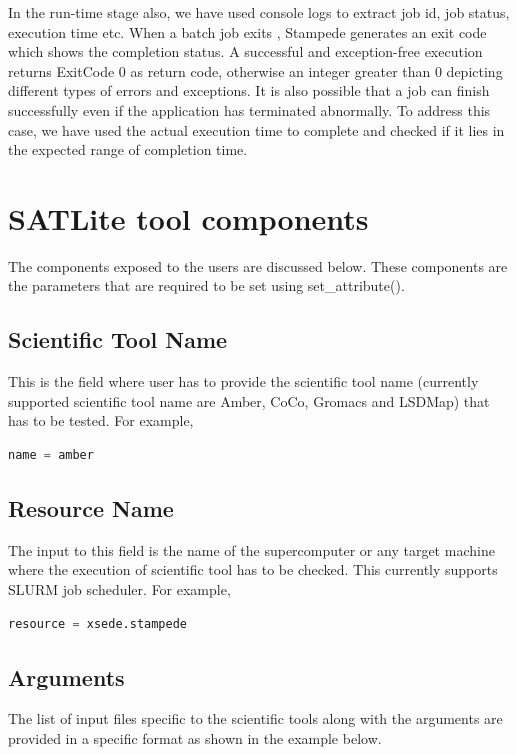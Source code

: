 \documentclass[10pt]{ruthesis}
\begin{document}
In the run-time stage also, we have used console logs to extract job id, job status, execution time etc. When a batch job exits \cite{ref6}, Stampede generates an exit code which shows the completion status. A successful and exception-free execution returns ExitCode 0 as return code, otherwise an integer greater than 0 depicting different types of errors and exceptions. It is also possible that a job can finish successfully even if the application has terminated abnormally. To address this case, we have used the actual execution time to complete and checked if it lies in the expected range of completion time.

\section{SATLite tool components}
The components exposed to the users are discussed below. These components are the parameters that are required to be set using set\_attribute().

\subsection{Scientific Tool Name}
This is the field where user has to provide the scientific tool name (currently supported scientific tool name are Amber, CoCo, Gromacs and LSDMap) that has to be tested. For example,

\begin{lstlisting}[language=Python,linewidth=3.7cm]
  name = amber
\end{lstlisting}

\subsection{Resource Name}
The input to this field is the name of the supercomputer or any target machine where the execution of scientific tool has to be checked. This currently supports SLURM job scheduler. For example,

\begin{lstlisting}[language=Python,linewidth=5.7cm]
 resource = xsede.stampede
\end{lstlisting}


\subsection{Arguments}
The list of input files specific to the scientific tools along with the arguments are provided in a specific format as shown in the example below.
\end{document}
